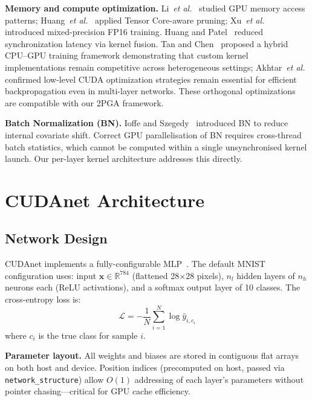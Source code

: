 \documentclass[conference]{IEEEtran}
\begin{document}
\textbf{Memory and compute optimization.} Li~\textit{et al.}~\cite{b12} studied GPU memory access patterns; Huang~\textit{et al.}~\cite{b11} applied Tensor Core-aware pruning; Xu~\textit{et al.}~\cite{b15} introduced mixed-precision FP16 training. Huang and Patel~\cite{b17} reduced synchronization latency via kernel fusion. Tan and Chen~\cite{b19} proposed a hybrid CPU--GPU training framework demonstrating that custom kernel implementations remain competitive across heterogeneous settings; Akhtar~\textit{et al.}~\cite{b20} confirmed low-level CUDA optimization strategies remain essential for efficient backpropagation even in multi-layer networks. These orthogonal optimizations are compatible with our 2PGA framework.

\textbf{Batch Normalization (BN).} Ioffe and Szegedy~\cite{b8} introduced BN to reduce internal covariate shift. Correct GPU parallelisation of BN requires cross-thread batch statistics, which cannot be computed within a single unsynchronised kernel launch. Our per-layer kernel architecture addresses this directly.

\section{CUDAnet Architecture}

\subsection{Network Design}

CUDAnet implements a fully-configurable MLP~\cite{b3}. The default MNIST configuration uses: input $\mathbf{x} \in \mathbb{R}^{784}$ (flattened 28$\times$28 pixels), $n_l$ hidden layers of $n_h$ neurons each (ReLU activations), and a softmax output layer of 10 classes. The cross-entropy loss is:
\begin{equation}
\mathcal{L} = -\frac{1}{N} \sum_{i=1}^{N} \log \hat{y}_{i,c_i}
\end{equation}
where $c_i$ is the true class for sample $i$.

\textbf{Parameter layout.} All weights and biases are stored in contiguous flat arrays on both host and device. Position indices (precomputed on host, passed via \texttt{network\_structure}) allow $O(1)$ addressing of each layer's parameters without pointer chasing—critical for GPU cache efficiency.
\end{document}
